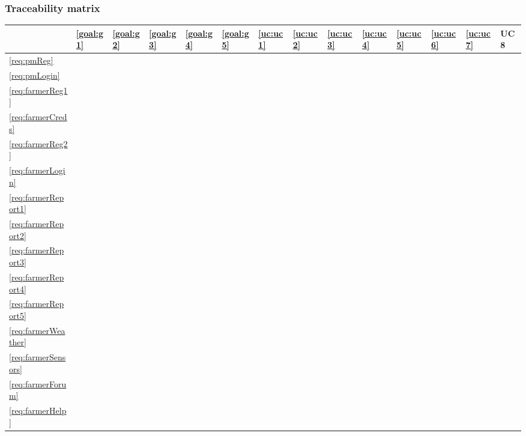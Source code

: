 \documentclass[10pt]{article}
\begin{document}
\subsubsection{Traceability matrix}
\begin{table}[]
    \begin{tabular}{l|lllll|llllllll}
        & \ref{goal:g1} & \ref{goal:g2} & \ref{goal:g3} & \ref{goal:g4} & \ref{goal:g5} & \ref{uc:uc1} & \ref{uc:uc2} & \ref{uc:uc3} & \ref{uc:uc4} & \ref{uc:uc5} & \ref{uc:uc6} & \ref{uc:uc7} & UC8 \\ \hline
    \ref{req:pmReg}  &    &    &    &    &    &     &     &     &     &     &     &     &     \\
    \ref{req:pmLogin}  &    &    &    &    &    &     &     &     &     &     &     &     &     \\
    \ref{req:farmerReg1}  &    &    &    &    &    &     &     &     &     &     &     &     &     \\
    \ref{req:farmerCreds}  &    &    &    &    &    &     &     &     &     &     &     &     &     \\
    \ref{req:farmerReg2}  &    &    &    &    &    &     &     &     &     &     &     &     &     \\
    \ref{req:farmerLogin}  &    &    &    &    &    &     &     &     &     &     &     &     &     \\
    \ref{req:farmerReport1}  &    &    &    &    &    &     &     &     &     &     &     &     &     \\
    \ref{req:farmerReport2}  &    &    &    &    &    &     &     &     &     &     &     &     &     \\
    \ref{req:farmerReport3}  &    &    &    &    &    &     &     &     &     &     &     &     &     \\
    \ref{req:farmerReport4}  &    &    &    &    &    &     &     &     &     &     &     &     &     \\
    \ref{req:farmerReport5} &    &    &    &    &    &     &     &     &     &     &     &     &     \\
    \ref{req:farmerWeather} &    &    &    &    &    &     &     &     &     &     &     &     &     \\
    \ref{req:farmerSensors} &    &    &    &    &    &     &     &     &     &     &     &     &     \\
    \ref{req:farmerForum} &    &    &    &    &    &     &     &     &     &     &     &     &     \\
    \ref{req:farmerHelp} &    &    &    &    &    &     &     &     &     &     &     &     &     \\

\end{tabular}
\end{table}
\end{document}
